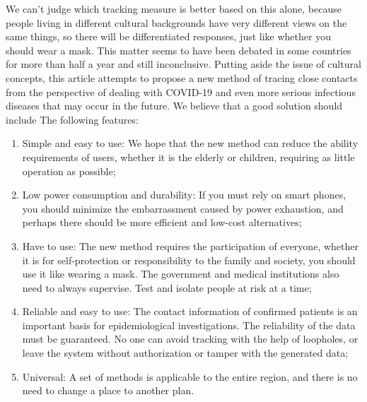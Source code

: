 \documentclass[conference]{IEEEtran}
\begin{document}
\par We can’t judge which tracking measure is better based on this alone, because people living in different cultural backgrounds have very different views on the same things, so there will be differentiated responses, just like whether you should wear a mask. This matter seems to have been debated in some countries for more than half a year and still inconclusive. Putting aside the issue of cultural concepts, this article attempts to propose a new method of tracing close contacts from the perspective of dealing with COVID-19 and even more serious infectious diseases that may occur in the future. We believe that a good solution should include The following features:
\begin{enumerate}
	\item Simple and easy to use: We hope that the new method can reduce the ability requirements of users, whether it is the elderly or children, requiring as little operation as possible;
	\item Low power consumption and durability: If you must rely on smart phones, you should minimize the embarrassment caused by power exhaustion, and perhaps there should be more efficient and low-cost alternatives;
	\item Have to use: The new method requires the participation of everyone, whether it is for self-protection or responsibility to the family and society, you should use it like wearing a mask. The government and medical institutions also need to always supervise. Test and isolate people at risk at a time;
	\item Reliable and easy to use: The contact information of confirmed patients is an important basis for epidemiological investigations. The reliability of the data must be guaranteed. No one can avoid tracking with the help of loopholes, or leave the system without authorization or tamper with the generated data;
	\item Universal: A set of methods is applicable to the entire region, and there is no need to change a place to another plan.
\end{enumerate}
\end{document}
